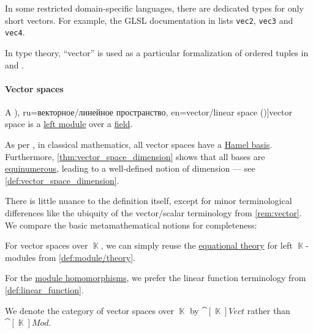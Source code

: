 \begin{remark}
\begin{thmenum}
    In some restricted domain-specific languages, there are dedicated types for only short vectors. For example, the GLSL documentation in \cite{GLSL:DataType} lists \Verb|vec2|, \Verb|vec3| and \Verb|vec4|.

    In type theory, \enquote{vector} is used as a particular formalization of ordered tuples in \cite[170]{UnivalentFoundationsProgram2013HoTT} and \cite[\S 6.4.7]{Mimram2020ProgramEqualsProof}.
  \end{thmenum}
\end{remark}

\paragraph{Vector spaces}

\begin{definition}\label{def:vector_space}
  A \term[ru=линейно пространство (\cite[111]{Обрешков1962ВисшаАлгебра}), ru=векторное/линейное пространство, en=vector/linear space (\cite[7]{FriedbergInselSpence2018LinearAlgebra})]{vector space} is a \hyperref[def:module]{left module} over a \hyperref[def:field]{field}.

  As per , in classical mathematics, all vector spaces have a \hyperref[def:hamel_basis]{Hamel basis}. Furthermore, \cref{thm:vector_space_dimension} shows that all bases are \hyperref[def:equinumerosity]{equinumerous}, leading to a well-defined notion of dimension --- see \cref{def:vector_space_dimension}.

  There is little nuance to the definition itself, except for minor terminological differences like the ubiquity of the vector/scalar terminology from \cref{rem:vector}. We compare the basic metamathematical notions for completeness:
  \begin{thmenum}
    \mimprovised For vector spaces over \( \BbbK \), we can simply reuse the \hyperref[def:fol_equational_theory]{equational theory} for left \( \BbbK \)-modules from \cref{def:module/theory}.

     For the \hyperref[def:module/morphism]{module homomorphisms}, we prefer the linear function terminology from \cref{def:linear_function}.

     We denote the category of vector spaces over \( \BbbK \) by \( \cat[\BbbK]{Vect} \) rather than \( \cat[\BbbK]{Mod} \).


\end{thmenum}
\end{definition}
